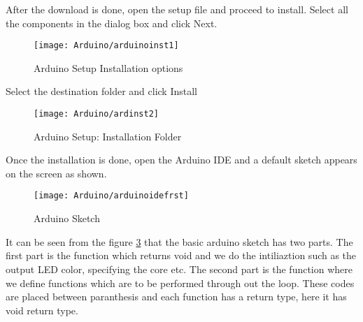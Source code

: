 After the download is done, open the setup file and proceed to install.
Select all the components in the dialog box and click Next.

\begin{figure}
	\centering
	\texttt{[image: Arduino/arduinoinst1]}
	\caption{Arduino Setup Installation options}\label{ArduinoIDEInst1}
\end{figure}

Select the destination folder and click Install

\begin{figure}
	\centering
	\texttt{[image: Arduino/ardinst2]}
	\caption{Arduino Setup: Installation Folder}\label{ArduinoIDEInst2}
\end{figure}

Once the installation is done, open the Arduino IDE and a default sketch appears on the screen as shown.

\begin{figure}
	\centering
	\texttt{[image: Arduino/arduinoidefrst]}
	\caption{Arduino Sketch}\label{ArduinoIDEFirst}
\end{figure}

It can be seen from the figure \ref{ArduinoIDEFirst} that the basic arduino sketch has two parts. The first part is the function  which returns void and we do the intiliaztion such as the output LED color, specifying the core etc. The second part is the function  where we define functions which are to be performed through out the loop. These codes are placed between paranthesis \PYTHON{$\{ \}$} and each function has a return type, here it has void return type.


